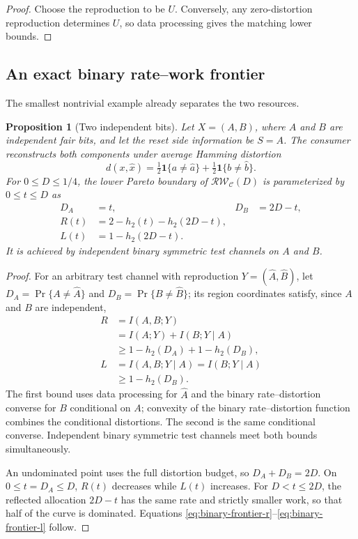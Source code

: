 \documentclass[letterpaper,onecolumn]{IEEEtran}
\newtheorem{proposition}{Proposition}
\theoremstyle{definition}
\theoremstyle{remark}
\newcommand{\cC}{\mathcal{C}}
\newcommand{\RW}{\mathcal{R}\!\mathcal{W}}
\newcommand{\1}{\mathbf{1}}
\newcommand{\hbin}{h_2}
\begin{document}
\begin{proof}
Choose the reproduction to be $U$. Conversely, any zero-distortion
reproduction determines $U$, so data processing gives the matching lower
bounds.
\end{proof}

\subsection{An exact binary rate--work frontier}

The smallest nontrivial example already separates the two resources.

\begin{proposition}[Two independent bits]\label{prop:binary-frontier}
Let $X=(A,B)$, where $A$ and $B$ are independent fair bits, and let the reset
side information be $S=A$. The consumer reconstructs both components under
average Hamming distortion
\begin{equation}
 d(x,\hat x)=\tfrac12\1\{a\ne\hat a\}
             +\tfrac12\1\{b\ne\hat b\}.
\end{equation}
For $0\le D\le1/4$, the lower Pareto boundary of
$\RW_{\cC}(D)$ is parameterized by $0\le t\le D$ as
\begin{align}
 D_A&=t, &D_B&=2D-t,\label{eq:binary-allocation}\\
 R(t)&=2-\hbin(t)-\hbin(2D-t),\label{eq:binary-frontier-r}\\
 L(t)&=1-\hbin(2D-t).\label{eq:binary-frontier-l}
\end{align}
It is achieved by independent binary symmetric test channels on $A$ and $B$.
\end{proposition}

\begin{proof}
For an arbitrary test channel with reproduction
$Y=(\widehat A,\widehat B)$, let $D_A=\Pr\{A\ne\widehat A\}$ and
$D_B=\Pr\{B\ne\widehat B\}$; its region coordinates satisfy, since $A$ and $B$
are independent,
\begin{align}
 R&=I(A,B;Y)\nonumber\\
  &=I(A;Y)+I(B;Y\mid A)\nonumber\\
  &\ge 1-\hbin(D_A)+1-\hbin(D_B),\label{eq:binary-r-lb}\\
 L&=I(A,B;Y\mid A)=I(B;Y\mid A)\nonumber\\
  &\ge1-\hbin(D_B).\label{eq:binary-l-lb}
\end{align}
The first bound uses data processing for $\widehat A$ and the binary
rate--distortion converse for $B$ conditional on $A$; convexity of the binary
rate--distortion function combines the conditional distortions. The second is
the same conditional converse. Independent binary symmetric test channels meet
both bounds simultaneously.

An undominated point uses the full distortion budget, so
$D_A+D_B=2D$. On $0\le t=D_A\le D$, $R(t)$ decreases while $L(t)$ increases.
For $D<t\le2D$, the reflected allocation $2D-t$ has the same rate and strictly
smaller work, so that half of the curve is dominated. Equations
\eqref{eq:binary-frontier-r}--\eqref{eq:binary-frontier-l} follow.
\end{proof}
\end{document}

